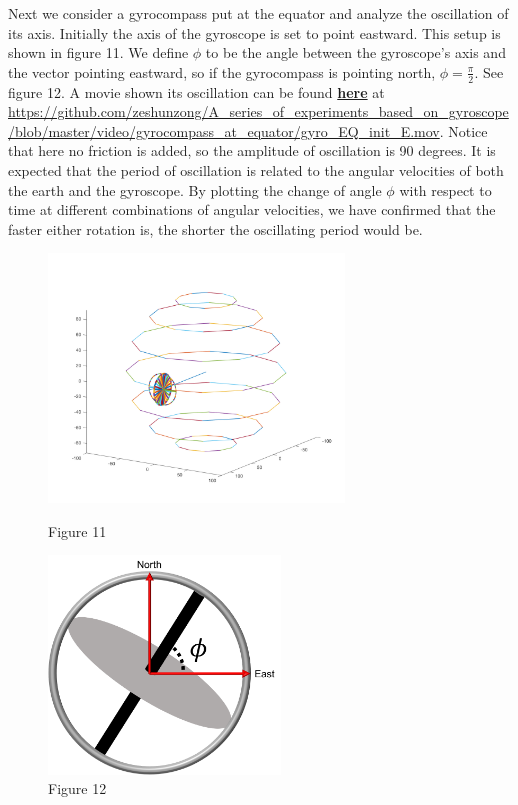 \documentclass[12pt]{article}
\renewcommand{\(}{\left (}
\renewcommand{\)}{\right )}
\begin{document}
Next we consider a gyrocompass put at the equator and analyze the oscillation of its axis. Initially the axis of the gyroscope is set to point eastward. This setup is shown in figure 11. We define $\phi$ to be the angle between the gyroscope's axis and the vector pointing eastward, so if the gyrocompass is pointing north, $\phi = \frac{\pi}{2}.$ See figure 12. A movie shown its oscillation can be found \href{https://github.com/zeshunzong/A_series_of_experiments_based_on_gyroscope/blob/master/video/gyrocompass_at_equator/gyro_EQ_init_E.mov}{\textbf{here}} at \url{https://github.com/zeshunzong/A_series_of_experiments_based_on_gyroscope/blob/master/video/gyrocompass_at_equator/gyro_EQ_init_E.mov}. Notice that here no friction is added, so the amplitude of oscillation is 90 degrees. It is expected that the period of oscillation is related to the angular velocities of both the earth and the gyroscope. By plotting the change of angle $\phi$ with respect to time at different combinations of angular velocities, we have confirmed that the faster either rotation is, the shorter the oscillating period would be.
\begin{figure}[ht]
	\begin{minipage}{0.5\textwidth}
		\centering
		\includegraphics[width=0.7\textwidth]{gyrocompass_at_equator.png}
		\caption*{\small Figure 11}
	\end{minipage}
	\begin{minipage}{0.5\textwidth}
		\centering
		\includegraphics[width=0.55\textwidth]{define_phi.png}
		\caption*{\small Figure 12}
	\end{minipage}
\end{figure}
\end{document}
